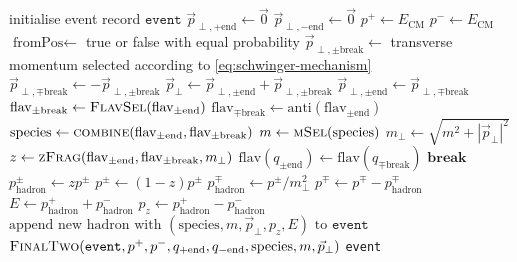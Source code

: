\documentclass[12pt,a4paper]{report}
\begin{document}
\begin{algorithm}
  \begin{algorithmic}
      \Repeat
      \State initialise event record $\texttt{event}$
      \State $\vec{p}_{\perp,+\text{end}} \gets \vec{0}$
      \State $\vec{p}_{\perp,-\text{end}} \gets \vec{0}$
      \State $p^+ \gets E_\text{CM}$
      \State $p^- \gets E_\text{CM}$
      \Loop
        \State $\text{fromPos} \gets$ true or false with equal probability 
        \State $\vec{p}_{\perp,\pm\text{break}} \gets$ transverse momentum selected according to \eqref{eq:schwinger-mechanism}
        \State $\vec{p}_{\perp,\mp\text{break}} \gets -\vec{p}_{\perp,\pm\text{break}}$
        \State $\vec{p}_\perp \gets \vec{p}_{\perp,\pm\text{end}} + \vec{p}_{\perp,\pm\text{break}}$
        \State $\vec{p}_{\perp,\pm\text{end}} \gets \vec{p}_{\perp,\mp\text{break}}$
        \Repeat {}
          \State $\text{flav}_{\pm\text{break}} \gets \textsc{FlavSel}(\text{flav}_{\pm\text{end}})$
          \State $\text{flav}_{\mp\text{break}} \gets \text{anti}(\text{flav}_{\pm\text{end}})$
          \State $\text{species} \gets \textsc{combine}(\text{flav}_{\pm\text{end}}, \text{flav}_{\pm\text{break}})$
          \State $m \gets \textsc{mSel}(\text{species})$
          \State $m_\perp \gets \sqrt{m^2 + |\vec{p}_\perp|^2}$
          \State $z \gets \textsc{zFrag}(\text{flav}_{\pm\text{end}}, \text{flav}_{\pm\text{break}}, m_\perp)$
          \State $\text{flav}(q_{\pm\text{end}}) \gets \text{flav}(q_{\mp\text{break}})$
          \State $\textbf{break}$
        \EndIf
        \State $p^\pm_\text{hadron} \gets z p^\pm$ 
        \State $p^\pm \gets (1 - z) p^\pm$
        \State $p^\mp_\text{hadron} \gets p^\pm / m_\perp^2$
        \State $p^\mp \gets p^\mp - p^\mp_\text{hadron}$ \protect\footnotemark
        \State $E \gets p_\text{hadron}^+ + p_\text{hadron}^-$
        \State $p_{z} \gets p_\text{hadron}^+ - p_\text{hadron}^-$
        \State $\text{append new hadron with } (\text{species}, m, \vec{p}_\perp, p_z, E) \text{ to } \texttt{event}$
      \EndLoop
      \State $\textsc{FinalTwo}(\texttt{event}, p^+, p^-, q_{+\text{end}},q_{-\text{end}}, \text{species}, m, \vec{p}_\perp)$
    \State \Return \texttt{event}
    \EndProcedure
  \end{algorithmic}
  \caption{The default PYTHIA 8.315 algorithm for $q\bar{q}$ hadronisation.} \label{alg:default}
\end{algorithm}
\end{document}
